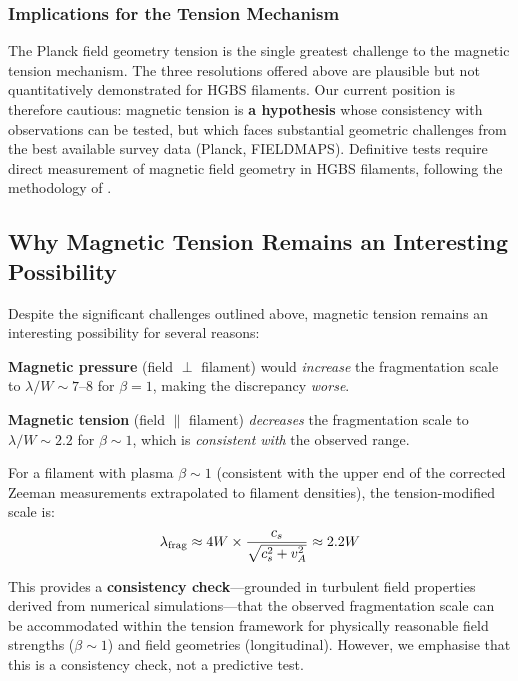 \documentclass[11pt,a4paper]{article}
\begin{document}
\subsubsection{Implications for the Tension Mechanism}

The Planck field geometry tension is the single greatest challenge to the magnetic tension mechanism. The three resolutions offered above are plausible but not quantitatively demonstrated for HGBS filaments. Our current position is therefore cautious: magnetic tension is \textbf{a hypothesis} whose consistency with observations can be tested, but which faces substantial geometric challenges from the best available survey data (Planck, FIELDMAPS). Definitive tests require direct measurement of magnetic field geometry in HGBS filaments, following the methodology of \citet{Jadhav2026}.

\subsection{Why Magnetic Tension Remains an Interesting Possibility}

Despite the significant challenges outlined above, magnetic tension remains an interesting possibility for several reasons:

\textbf{Magnetic pressure} (field $\perp$ filament) would \textit{increase} the fragmentation scale to $\lambda/W \sim 7$--$8$ for $\beta = 1$, making the discrepancy \textit{worse}.

\textbf{Magnetic tension} (field $\parallel$ filament) \textit{decreases} the fragmentation scale to $\lambda/W \sim 2.2$ for $\beta \sim 1$, which is \textit{consistent with} the observed range.

For a filament with plasma $\beta \sim 1$ (consistent with the upper end of the corrected Zeeman measurements extrapolated to filament densities), the tension-modified scale is:
\begin{equation}
\lambda_{\rm frag} \approx 4W \times \frac{c_s}{\sqrt{c_s^2 + v_A^2}} \approx 2.2W
\label{eq:tension2}
\end{equation}

This provides a \textbf{consistency check}—grounded in turbulent field properties derived from numerical simulations—that the observed fragmentation scale can be accommodated within the tension framework for physically reasonable field strengths ($\beta \sim 1$) and field geometries (longitudinal). However, we emphasise that this is a consistency check, not a predictive test.
\end{document}
